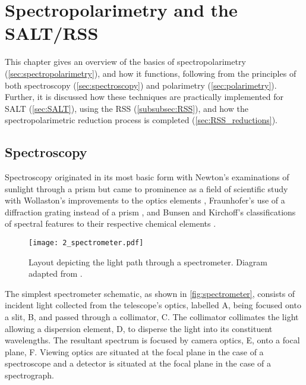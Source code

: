 \chapter[Spectropolarimetry and the SALT/RSS]{Spectropolarimetry and the \gls{SALT}/\gls{RSS}} \label{ch:02}

This chapter gives an overview of the basics of spectropolarimetry (\autoref{sec:spectropolarimetry}), and how it functions, following from the principles of both spectroscopy (\autoref{sec:spectroscopy}) and polarimetry (\autoref{sec:polarimetry}).
Further, it is discussed how these techniques are practically implemented for \gls{SALT} (\autoref{sec:SALT}), using the \gls{RSS} (\autoref{subsubsec:RSS}), and how the spectropolarimetric reduction process is completed (\autoref{sec:RSS_reductions}).

\section{Spectroscopy} \label{sec:spectroscopy}

Spectroscopy originated in its most basic form with Newton's examinations of sunlight through a prism \citep{opticks} but came to prominence as a field of scientific study with Wollaston's improvements to the optics elements \citep{WollPrism}, Fraunhofer's use of a diffraction grating instead of a prism \citep{FraunGrating}, and Bunsen and Kirchoff's classifications of spectral features to their respective chemical elements \citep{KirBunSpec}.

\begin{figure}[t]
    \centering
    \texttt{[image: 2\_spectrometer.pdf]}
    \caption{
        Layout depicting the light path through a spectrometer.
        Diagram adapted from \cite{BirneyObsAstro}.
    }
    \label{fig:spectrometer}
\end{figure}

The simplest spectrometer schematic, as shown in \autoref{fig:spectrometer}, consists of incident light collected from the telescope's optics, labelled A, being focused onto a slit, B, and passed through a collimator, C.
The collimator collimates the light allowing a dispersion element, D, to disperse the light into its constituent wavelengths.
The resultant spectrum is focused by camera optics, E, onto a focal plane, F.
Viewing optics are situated at the focal plane in the case of a spectroscope and a detector is situated at the focal plane in the case of a spectrograph.

